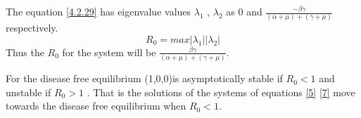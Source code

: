 The equation \ref{4.2.29} has eigenvalue values $\lambda_1$ , $\lambda_2$ as 0 and $\frac{- \beta\gamma}{(\alpha +\mu)+ (\gamma + \mu)}$ respectively.
 \begin{equation}
 R_0 = max {|\lambda_1| |\lambda_2|}
 \end{equation}
Thus the $R_0$ for the system will be $\frac{ \beta\gamma}{(\alpha +\mu)+ (\gamma + \mu)}$.

For the disease free equilibrium (1,0,0)is asymptotically stable if $R_0 < 1$ and unstable if $R_0 > 1$ \citep{van2002reproduction}. That is the solutions of the systems of equations \ref{5} \ref{7} move towards the disease free equilibrium when $R_0 < 1$.


%
%
%
%
%
%
